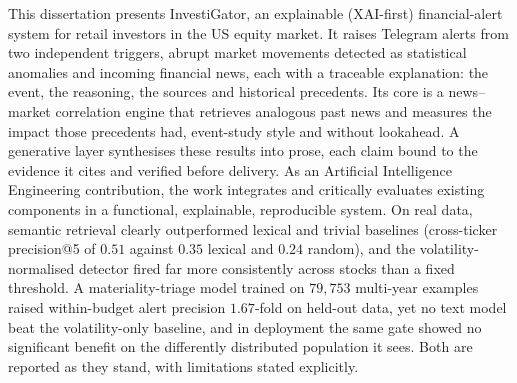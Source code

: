 \begin{abstractotherlanguage}


This dissertation presents InvestiGator, an explainable (XAI-first) financial-alert system for retail
investors in the US equity market. It raises Telegram alerts from two independent triggers, abrupt
market movements detected as statistical anomalies and incoming financial news, each with
a traceable explanation: the event, the reasoning, the sources and historical precedents. Its core is
a news--market correlation engine that retrieves analogous past news and measures the impact those
precedents had, event-study style and without lookahead. A generative layer synthesises
these results into prose, each claim bound to the evidence it cites and verified before delivery. As
an Artificial Intelligence Engineering contribution, the work integrates and critically evaluates
existing components in a functional, explainable, reproducible system. On real data,
semantic retrieval clearly outperformed lexical and trivial baselines (cross-ticker precision@5 of
$0.51$ against $0.35$ lexical and $0.24$ random), and the volatility-normalised detector fired far
more consistently across stocks than a fixed threshold. A materiality-triage model trained on
$79{,}753$ multi-year examples raised within-budget alert precision $1.67$-fold on held-out data, yet
no text model beat the volatility-only baseline, and in deployment the same gate showed no
significant benefit on the differently distributed population it sees. Both are reported as
they stand, with limitations stated explicitly.

\end{abstractotherlanguage}


